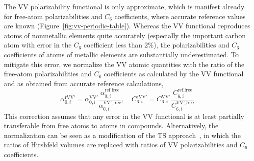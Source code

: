 The VV polarizability functional is only approximate, which is manifest already for free-atom polarizabilities and $C_6$ coefficients, where accurate reference values are known (Figure~\ref{fig:vv-periodic-table}).
Whereas the VV functional reproduces atoms of nonmetallic elements quite accurately (especially the important carbon atom with error in the $C_6$ coefficient less than 2\%), the polarizabilities and $C_6$ coefficients of atoms of metallic elements are substantially underestimated.
To mitigate this error, we normalize the VV atomic quantities with the ratio of the free-atom polarizabilities and $C_6$ coefficients as calculated by the VV functional and as obtained from accurate reference calculations,
\begin{equation}
  \alpha_{0,i}^\text{rVV$'$}=\alpha_{0,i}^\mathrm{VV'}\frac{\alpha_{0,i}^\text{ref,free}}{\alpha_{0,i}^\text{VV$'$,free}},\quad
  C_{6,i}^\text{rVV$'$}=C_{6,i}^\mathrm{VV'}\frac{C_{6,i}^\text{ref,free}}{C_{6,i}^\text{VV$'$,free}}
\end{equation}
This correction assumes that any error in the VV functional is at least partially transferable from free atoms to atoms in compounds.
Alternatively, the normalization can be seen as a modification of the TS approach~\citep{TkatchenkoPRL09}, in which the ratios of Hirshfeld volumes are replaced with ratios of VV polarizabilities and $C_6$ coefficients.


